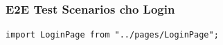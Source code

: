 \documentclass[a4paper,12pt]{article}
\begin{document}
{\begin{itemize}













\end{itemize}


\subsubsection{E2E Test Scenarios cho Login}


\begin{tcolorbox}[breakable, colback=green!5,colframe=black!50,title=Automated tests cho toàn bộ login flow]
\begin{lstlisting}
import LoginPage from "../pages/LoginPage";


\end{lstlisting}
\end{tcolorbox}}
\end{document}
